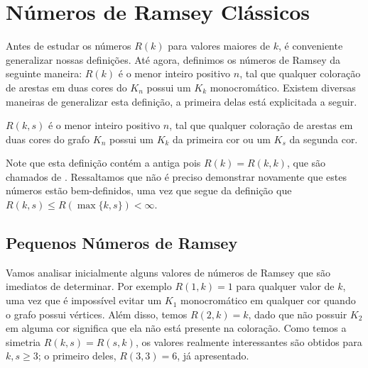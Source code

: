 
\chapter{Números de Ramsey Clássicos}
\label{chap:prelim}


Antes de estudar os números $R(k)$ para valores maiores de $k$, é conveniente generalizar nossas definições. Até agora, definimos os números de Ramsey da seguinte maneira: $R(k)$ é o menor inteiro positivo $n$, tal que qualquer coloração de arestas em duas cores do $K_n$ possui um $K_k$ monocromático. Existem diversas maneiras de generalizar esta definição, a primeira delas está explicitada a seguir.

\begin{definition}
$R(k,s)$ é o menor inteiro positivo $n$, tal que qualquer coloração de arestas em duas cores do grafo $K_n$ possui um $K_k$ da primeira cor ou um $K_s$ da segunda cor.
\end{definition}

Note que esta definição contém a antiga pois $R(k) = R(k,k)$, que são chamados de . Ressaltamos que não é preciso demonstrar novamente que estes números estão bem-definidos, uma vez que segue da definição que $R(k,s) \leq R(\max\{k,s\}) < \infty$.


\section{Pequenos Números de Ramsey}

Vamos analisar inicialmente alguns valores de números de Ramsey que são imediatos de determinar. Por exemplo $R(1,k) = 1$ para qualquer valor de $k$, uma vez que é impossível evitar um $K_1$ monocromático em qualquer cor quando o grafo possui vértices. Além disso, temos $R(2,k) = k$, dado que não possuir $K_2$ em alguma cor significa que ela não está presente na coloração. Como temos a simetria $R(k,s) = R(s,k)$, os valores realmente interessantes são obtidos para $k,s \geq 3$; o primeiro deles, $R(3,3) = 6$, já apresentado.

